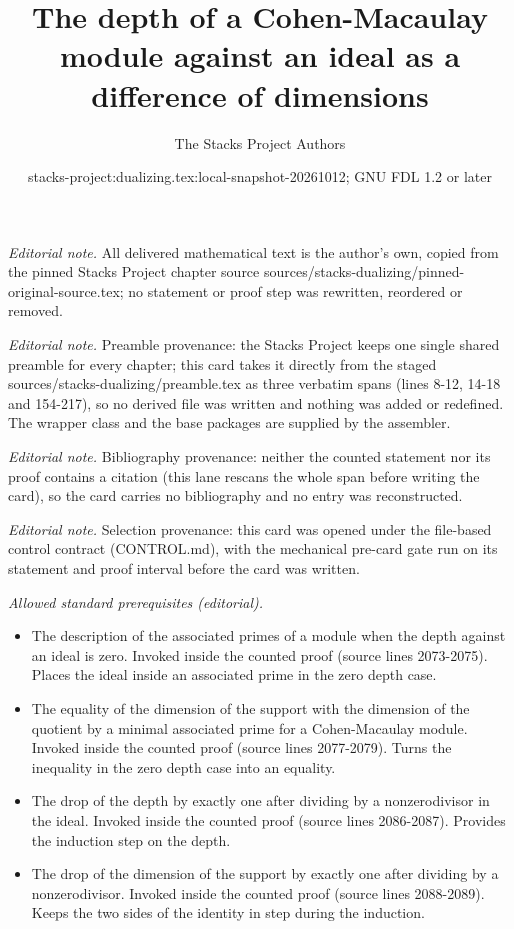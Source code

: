 \documentclass[10pt,a4paper]{amsart}
\title{The depth of a Cohen-Macaulay module against an ideal as a difference of dimensions}
\author{The Stacks Project Authors}
\date{stacks-project:dualizing.tex:local-snapshot-20261012; GNU FDL 1.2 or later}
\theoremstyle{plain}
\theoremstyle{definition}
\theoremstyle{remark}
\numberwithin{equation}{subsection}
\begin{document}
\maketitle
\noindent\textit{Editorial note.} All delivered mathematical text is the author's own, copied from the pinned Stacks Project chapter source sources/stacks-dualizing/pinned-original-source.tex; no statement or proof step was rewritten, reordered or removed.\par\medskip
\noindent\textit{Editorial note.} Preamble provenance: the Stacks Project keeps one single shared preamble for every chapter; this card takes it directly from the staged sources/stacks-dualizing/preamble.tex as three verbatim spans (lines 8-12, 14-18 and 154-217), so no derived file was written and nothing was added or redefined. The wrapper class and the base packages are supplied by the assembler.\par\medskip
\noindent\textit{Editorial note.} Bibliography provenance: neither the counted statement nor its proof contains a citation (this lane rescans the whole span before writing the card), so the card carries no bibliography and no entry was reconstructed.\par\medskip
\noindent\textit{Editorial note.} Selection provenance: this card was opened under the file-based control contract (CONTROL.md), with the mechanical pre-card gate run on its statement and proof interval before the card was written.\par\medskip
\noindent\textit{Allowed standard prerequisites (editorial).}\begin{itemize}
\item The description of the associated primes of a module when the depth against an ideal is zero. Invoked inside the counted proof (source lines 2073-2075). Places the ideal inside an associated prime in the zero depth case.
\item The equality of the dimension of the support with the dimension of the quotient by a minimal associated prime for a Cohen-Macaulay module. Invoked inside the counted proof (source lines 2077-2079). Turns the inequality in the zero depth case into an equality.
\item The drop of the depth by exactly one after dividing by a nonzerodivisor in the ideal. Invoked inside the counted proof (source lines 2086-2087). Provides the induction step on the depth.
\item The drop of the dimension of the support by exactly one after dividing by a nonzerodivisor. Invoked inside the counted proof (source lines 2088-2089). Keeps the two sides of the identity in step during the induction.
\end{itemize}\medskip
\end{document}

